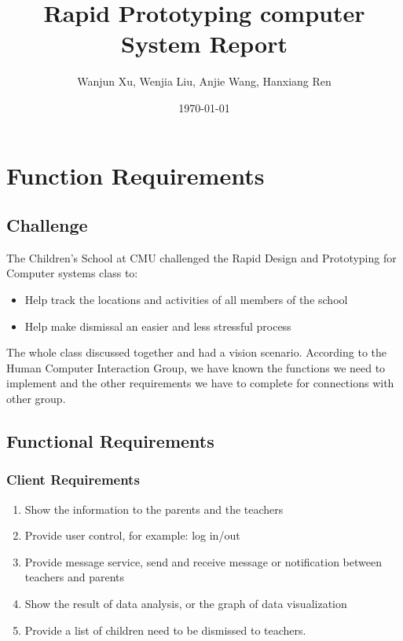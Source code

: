 \documentclass{article}
\begin{document}
	
\title{Rapid Prototyping computer System Report}
\author{Wanjun Xu, Wenjia Liu, Anjie Wang, Hanxiang Ren}
\date{\today}
\maketitle

\newpage

\tableofcontents

\newpage

\section{Function Requirements}

\subsection{Challenge}
 The Children’s School at CMU challenged the Rapid Design and Prototyping for Computer systems class to: 
\begin{itemize}
	\item Help track the locations and activities of all members of the school 
	\item Help make dismissal an easier and less stressful process 
\end{itemize}

The whole class discussed together and had a vision scenario. According to the Human Computer Interaction Group, we have known the functions we need to implement and the other requirements we have to complete for connections with other group.

\subsection{Functional Requirements}
\subsubsection{Client Requirements}
\begin{enumerate}
	\item Show the information to the parents and the teachers
	\item Provide user control, for example: log in/out
	\item Provide message service, send and receive message or notification between teachers and parents 
	\item Show the result of data analysis, or the graph of data visualization
	\item Provide a list of children need to be dismissed to teachers.
\end{enumerate}
\end{document}
